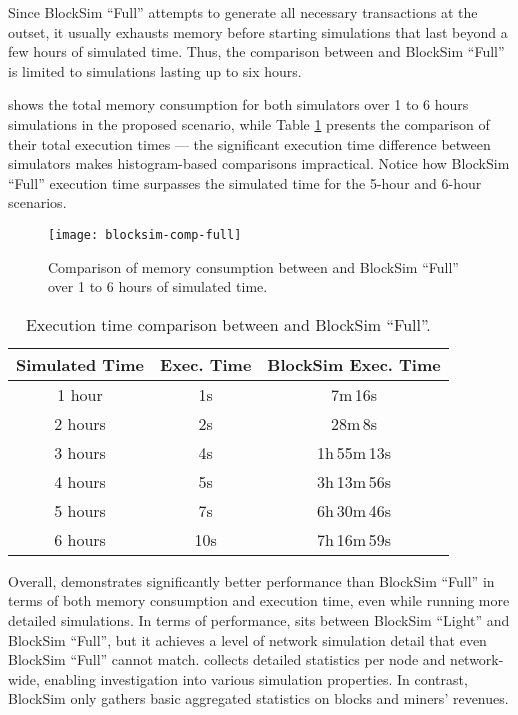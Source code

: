 Since BlockSim ``Full'' attempts to generate all necessary transactions at the
outset, it usually exhausts memory before starting simulations that last beyond
a few hours of simulated time. Thus, the comparison between \iblock{} and
BlockSim ``Full'' is limited to simulations lasting up to six hours.

 shows the total memory consumption for both
simulators over 1 to 6 hours simulations in the proposed scenario, while Table
\ref{tab:comparison-full-time} presents the comparison of their total execution
times --- the significant execution time difference between simulators makes
histogram-based comparisons impractical. Notice how BlockSim ``Full'' execution
time surpasses the simulated time for the 5-hour and 6-hour scenarios.

\begin{figure}[tbhp]
	\centering
	\texttt{[image: blocksim-comp-full]}
	\caption{Comparison of memory consumption between \iblock{} and
	BlockSim ``Full'' over 1 to 6 hours of simulated
	time.}\label{fig:comparison-full-memory}
\end{figure}

\begin{table}[tbhp]
	\centering
	\begin{tabular}{|c|c|c|}
		\toprule
		Simulated Time & \iblock{} Exec\@. Time & BlockSim Exec\@. Time \\
		\midrule
		1 hour & 1s & 7m\,16s \\[6pt]
		2 hours & 2s & 28m\,8s \\[6pt]
		3 hours & 4s & 1h\,55m\,13s \\[6pt]
		4 hours & 5s & 3h\,13m\,56s \\[6pt]
		5 hours & 7s & 6h\,30m\,46s \\[6pt]
		6 hours & 10s & 7h\,16m\,59s \\
		\bottomrule
	\end{tabular}
	\caption{Execution time comparison between \iblock{} and BlockSim
	``Full''.}\label{tab:comparison-full-time}
\end{table}

Overall, \iblock{} demonstrates significantly better performance than BlockSim
``Full'' in terms of both memory consumption and execution time, even while
running more detailed simulations. In terms of performance, \iblock{} sits
between BlockSim ``Light'' and BlockSim ``Full'', but it achieves a level of
network simulation detail that even BlockSim ``Full'' cannot match. \iblock{}
collects detailed statistics per node and network-wide, enabling investigation
into various simulation properties. In contrast, BlockSim only gathers basic
aggregated statistics on blocks and miners' revenues.
